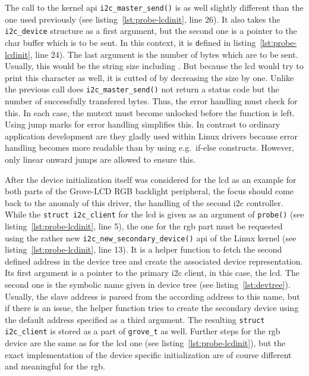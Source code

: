 The call to the kernel \ac{api} \texttt{i2c_master_send()} is as well slightly different than the one used previously (see listing~\ref{lst:probe-lcdinit}, line 26).
It also takes the \texttt{i2c\_device} structure as a first argument, but the second one is a pointer to the char buffer which is to be sent.
In this context, it is \texttt defined in listing~\ref{lst:probe-lcdinit}, line 24).
The last argument is the number of bytes which are to be sent. 
Usually, this would be the string size including \texttt{\n}.
But because the \ac{lcd} would try to print this character as well, it is cutted of by decreasing the size by one.
Unlike the previous call does \texttt{i2c_master_send()} not return a status code but the number of successfully transfered bytes.
Thus, the error handling must check for this.
In each case, the mutext must become unlocked before the function is left.
Using jump marks for error handling simplifies this.
In contrast to ordinary application development are they gladly used within Linux drivers because error handling becomes more readable than by using e.g.\ if-else constructs.
However, only linear onward jumps are allowed to ensure this.

After the device initialization itself was considered for the \ac{lcd} as an example for both parts of the Grove-LCD RGB backlight peripheral, the focus should come back to the anomaly of this driver, the handling of the second \ac{i2c} controller.
While the \texttt{struct i2c_client} for the \ac{lcd} is given as an argument of \texttt{probe()} (see listing~\ref{lst:probe-lcdinit}, line 5), the one for the \ac{rgb} part must be requested using the rather new \texttt{i2c_new_secondary_device()} \ac{api} of the Linux kernel (see listing~\ref{lst:probe-lcdinit}, line 13).
It is a helper function to fetch the second defined address in the device tree and create the associated device representation.
Its first argument is a pointer to the primary \ac{i2c} client, in this case, the \ac{lcd}.
The second one is the symbolic name given in device tree (see listing~\ref{lst:devtree}).
Usually, the slave address is parsed from the according address to this name, but if there is an issue, the helper function tries to create the secondary device using the default address specified as a third argument.
The resulting \texttt{struct i2c_client} is stored as a part of \texttt{grove_t} as well.
Further steps for the \ac{rgb} device are the same as for the \ac{lcd} one (see listing~\ref{lst:probe-lcdinit}), but the exact implementation of the device specific initialization are of course different and meaningful for the \ac{rgb}.


